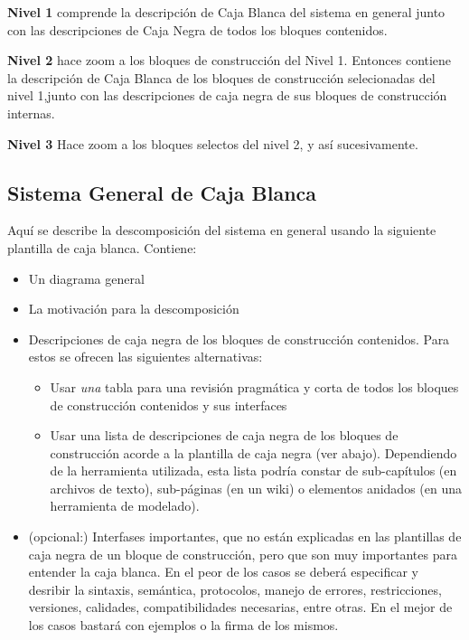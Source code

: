 \documentclass[]{article}
\begin{document}
\textbf{Nivel 1} comprende la descripción de Caja Blanca del sistema en
general junto con las descripciones de Caja Negra de todos los bloques
contenidos.

\textbf{Nivel 2} hace zoom a los bloques de construcción del Nivel 1.
Entonces contiene la descripción de Caja Blanca de los bloques de
construcción selecionadas del nivel 1,junto con las descripciones de
caja negra de sus bloques de construcción internas.

\textbf{Nivel 3} Hace zoom a los bloques selectos del nivel 2, y así
sucesivamente.

\hypertarget{_sistema_general_de_caja_blanca}{%
\subsection{Sistema General de Caja
Blanca}\label{_sistema_general_de_caja_blanca}}

Aquí se describe la descomposición del sistema en general usando la
siguiente plantilla de caja blanca. Contiene:

\begin{itemize}
\item
  Un diagrama general
\item
  La motivación para la descomposición
\item
  Descripciones de caja negra de los bloques de construcción contenidos.
  Para estos se ofrecen las siguientes alternativas:

  \begin{itemize}
  \item
    Usar \emph{una} tabla para una revisión pragmática y corta de todos
    los bloques de construcción contenidos y sus interfaces
  \item
    Usar una lista de descripciones de caja negra de los bloques de
    construcción acorde a la plantilla de caja negra (ver abajo).
    Dependiendo de la herramienta utilizada, esta lista podría constar
    de sub-capítulos (en archivos de texto), sub-páginas (en un wiki) o
    elementos anidados (en una herramienta de modelado).
  \end{itemize}
\item
  (opcional:) Interfases importantes, que no están explicadas en las
  plantillas de caja negra de un bloque de construcción, pero que son
  muy importantes para entender la caja blanca. En el peor de los casos
  se deberá especificar y desribir la sintaxis, semántica, protocolos,
  manejo de errores, restricciones, versiones, calidades,
  compatibilidades necesarias, entre otras. En el mejor de los casos
  bastará con ejemplos o la firma de los mismos.
\end{itemize}
\end{document}
